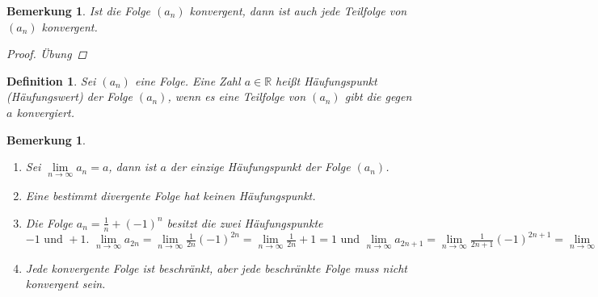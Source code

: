 \documentclass[a4paper,titlepage,oneside]{article}
\def\R{\ensuremath{\mathbb{R}} }
\renewcommand{\liminf}[2][n]{\ensuremath{\lim\limits_{#1 \rightarrow \infty}{#2}}}
\theoremstyle{thmstyle}
\newtheorem{defi}[satz]{Definition}
\newtheorem{bem}[satz]{Bemerkung}
\begin{document}
\begin{bem}
Ist die Folge \((a_n)\) konvergent, dann ist auch jede Teilfolge von \((a_n)\) konvergent.
\begin{proof} Übung \end{proof}
\end{bem}

\begin{defi}
Sei \((a_n)\) eine Folge. Eine Zahl \(a \in \R\) heißt Häufungspunkt (Häufungswert) der Folge \((a_n)\), wenn es eine Teilfolge von \((a_n)\) gibt die gegen \(a\) konvergiert.
\end{defi}

\begin{bem}
\begin{enumerate}
\item Sei \(\liminf{a_n} = a\), dann ist \(a\) der einzige Häufungspunkt der Folge \((a_n)\).
\item Eine bestimmt divergente Folge hat keinen Häufungspunkt.
\item Die Folge \(a_n = \frac{1}{n}+ (-1)^n\) besitzt die zwei Häufungspunkte \(-1\text{ und }+1\text{. }\liminf{a_{2n}} = \liminf{\frac{1}{2n} (-1)^{2n}} = \liminf{\frac{1}{2n}} + 1 = 1 \text{ und } \liminf{a_{2n+1}} = \liminf{\frac{1}{2n+1} (-1)^{2n+1}} = \liminf{\frac{1}{2n+1}} - 1 = - 1\)
\item Jede konvergente Folge ist beschränkt, aber jede beschränkte Folge muss nicht konvergent sein.
\end{enumerate}
\end{bem}
\end{document}
